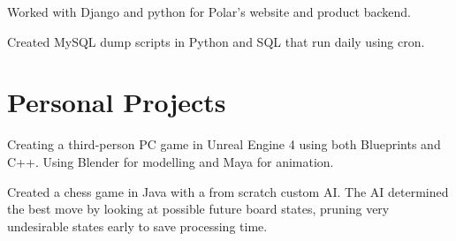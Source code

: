 \documentclass[letterpaper]{deedy-resume-modified} %
\begin{document}
\begin{minipage}[t]{0.66\textwidth}
\begin{tightitemize}
\item Worked with Django and python for Polar's website and product backend.
\item Created MySQL dump scripts in Python and SQL that run daily using cron.
\end{tightitemize}

\sectionspace %







\vspace{-8pt}
\section{Personal Projects}


Creating a third-person PC game in Unreal Engine 4 using both Blueprints and C++.  Using Blender for modelling and Maya for animation.

\sectionspace %



Created a chess game in Java with a from scratch custom AI. The AI determined the best move by looking at possible future board states, pruning very undesirable states early to save processing time.


\sectionspace %

\end{minipage} %

\end{document}
